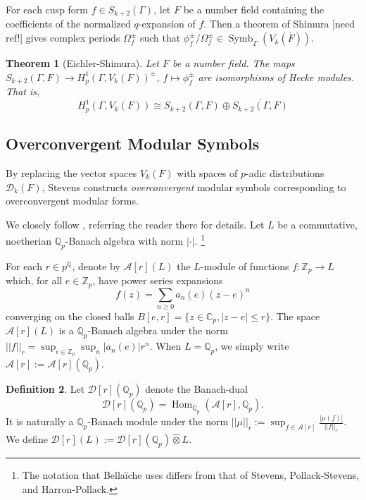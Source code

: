 \documentclass[10pt]{amsart}
\theoremstyle{plain}
\newtheorem{theorem}{Theorem}[section]
\theoremstyle{definition}
\newtheorem{definition}[theorem]{Definition}
\newcommand{\ZZ}{{\mathbb{Z}}}
\newcommand{\CC}{{\mathbb{C}}}
\newcommand{\QQ}{{\mathbb{Q}}}
\newcommand{\cA}{\mathcal{A}}
\newcommand{\cD}{\mathcal{D}}
\DeclareMathOperator{\Hom}{Hom}
\DeclareMathOperator{\Symb}{Symb}
\begin{document}
For each cusp form $f\in S_{k+2}(\Gamma)$, let $F$ be a number field containing the coefficients of the normalized $q$-expansion of $f$. Then a theorem of Shimura [need ref!] gives complex periods $\Omega_f^\pm$ such that $\phi_f^\pm/\Omega_f^\pm \in \Symb_\Gamma(V_k(\overline{F}))$. 
\begin{theorem}[Eichler-Shimura]
Let $F$ be a number field. The maps $S_{k+2}(\Gamma,F)\longrightarrow H^1_p(\Gamma, V_k(F))^\pm$, $f\mapsto \phi_{f}^\pm$ are isomorphisms of Hecke modules. That is,
\begin{equation*}
	H^1_p(\Gamma, V_k(F)) \cong S_{k+2}(\Gamma,F)\oplus \overline{S_{k+2}(\Gamma,F)}
\end{equation*}
\end{theorem}

\subsection{Overconvergent Modular Symbols}
By replacing the vector spaces $V_k(F)$ with spaces of $p$-adic distributions $\cD_k(F)$, Stevens \cite{Stevens} constructs \emph{overconvergent} modular symbols corresponding to  overconvergent modular forms.

We closely follow \cite{Bellaiche}, referring the reader there for details. Let $L$ be a commutative, noetherian $\QQ_p$-Banach algebra with norm $|\cdot |$. \footnote{ The notation that Bella\"iche uses differs from that of Stevens, Pollack-Stevens, and Harron-Pollack.} 

For each $r\in p^\QQ$, denote by $\cA[r](L)$ the $L$-module of functions $f:\ZZ_p\rightarrow L$ which, for all $e\in\ZZ_p$,  have power series expansions 
\begin{equation*}
	f(z) = \sum_{n \geq 0 } a_n(e) (z-e)^n
\end{equation*}
converging on the closed balls $B[e,r] = \{z \in \CC_p, |z-e| \leq r\}$. The space $\cA[r](L)$ is a $\QQ_p$-Banach algebra under the norm $||f ||_r = \sup_{e\in\ZZ_p} \sup_n |a_n(e)|r^n$. When $L=\QQ_p$, we simply write $\cA[r]:=\cA[r](\QQ_p)$.



\begin{definition}
Let $\cD[r](\QQ_p)$ denote the Banach-dual
\begin{equation}
	\cD[r](\QQ_p) = \Hom_{\QQ_p}(\cA[r],\QQ_p).
\end{equation}
It is naturally a $\QQ_p$-Banach module under the norm $||\mu||_r := \sup_{f\in \cA[r]} \frac{ |\mu(f)|}{||f||_r}$. We define $\cD[r](L) :=\cD[r](\QQ_p) \widehat{\otimes} L$.
\end{definition}
\end{document}
